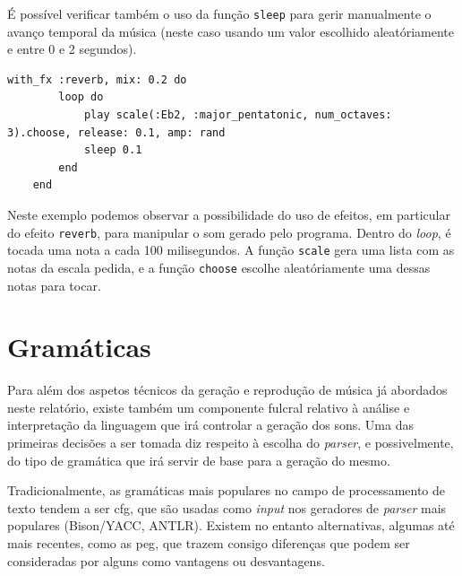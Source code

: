 \documentclass[
  oneside,
  11pt, a4paper,
  footinclude=true,
  headinclude=true,
  cleardoublepage=empty
]{scrbook}
\begin{document}
    É possível verificar também o uso da função \texttt{sleep} para gerir manualmente o avanço temporal da música (neste caso usando um valor escolhido aleatóriamente e entre 0 e 2 segundos).
    
    
    \begin{lstlisting}[caption={Reproduzir um notas de uma escala aleatórias, com efeito \textit{reverb}}] 
    with_fx :reverb, mix: 0.2 do
        loop do
            play scale(:Eb2, :major_pentatonic, num_octaves: 3).choose, release: 0.1, amp: rand
            sleep 0.1
        end
    end
    \end{lstlisting}
    Neste exemplo podemos observar a possibilidade do uso de efeitos, em particular do efeito \texttt{reverb}, para manipular o som gerado pelo programa. Dentro do \textit{loop}, é tocada uma nota a cada 100 milisegundos. A função \texttt{scale} gera uma lista com as notas da escala pedida, e a função \texttt{choose} escolhe aleatóriamente uma dessas notas para tocar.
    
	\section{Gramáticas}


Para além dos aspetos técnicos da geração e reprodução de música já abordados neste relatório, existe também um componente fulcral relativo à análise e interpretação da linguagem que irá controlar a geração dos sons. Uma das primeiras decisões a ser tomada diz respeito à escolha do \textit{parser}, e possivelmente, do tipo de gramática que irá servir de base para a geração do mesmo.

Tradicionalmente, as gramáticas mais populares no campo de processamento de texto tendem a ser \acrfull{cfg}, que são usadas como \textit{input} nos geradores de \textit{parser} mais populares (Bison/YACC, ANTLR). Existem no entanto alternativas, algumas até mais recentes, como as \acrfull{peg}, que trazem consigo diferenças que podem ser consideradas por alguns como vantagens ou desvantagens.
\end{document}
